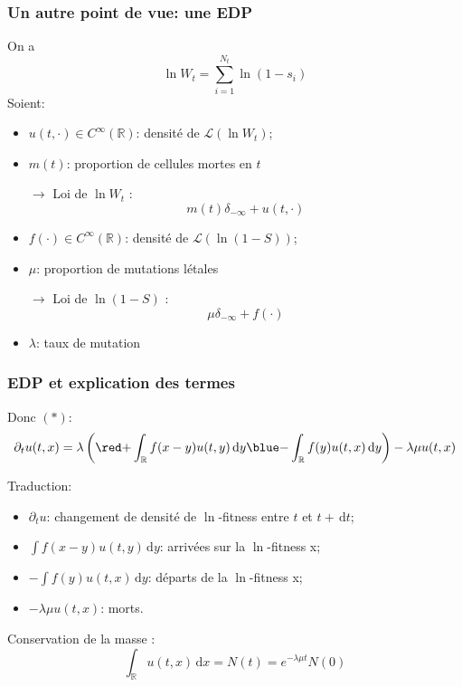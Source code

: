\documentclass{beamer}
\newcommand{\pth}[1]{\left(#1\right)}
\newcommand{\de}{\,\text{d}}
\newcommand{\Er}{\mathbb{R}}
\newcommand{\dr}{\partial}
\begin{document}
\begin{frame}
  \frametitle{Un autre point de vue: une EDP}

  On a \[\ln W_t=\sum_{i=1}^{N_t}\ln(1-s_i)\]
  Soient:
\begin{itemize}[label=$\bullet$]
\item $u(t,\cdot)\in C^{\infty}(\Er)$: densité de $\mathcal{L}(\ln W_t)$;
\item $m(t)$: proportion de cellules mortes en $t$

$\to$ Loi de $\ln W_t$ :
\[\label{def_u} m(t)\delta_{-\infty}+u(t,\cdot)\]
\pause
\item $f(\cdot)\in C^{\infty}(\Er)$: densité de $\mathcal{L}(\ln(1-S))$;
\item $\mu$: proportion de mutations létales

$\to$ Loi de $\ln (1-S)$ :
\[\mu\delta_{-\infty}+f(\cdot)\]
\item $\lambda$: taux de mutation
\end{itemize}

\end{frame}
\begin{frame}
  \frametitle{EDP et explication des termes}

Donc $(*)$:
\[\dr_tu(t,x)=\lambda\pth{{\red +}\int_{\Er}f(x-y)u(t,y)\de y{\blue -}\int_{\Er}f(y)u(t,x)\de y}-\lambda\mu u(t,x)\]

\vspace{0.5cm}

Traduction:%
\begin{itemize}[label=$\bullet$]
\item $\dr_tu$: changement de densité de $\ln$-fitness entre $t$ et $t+\de t$;
\item $\int f(x-y)u(t,y)\de y$: arrivées sur la $\ln$-fitness x;
\item $-\int f(y)u(t,x)\de y$: départs de la $\ln$-fitness x;
\item $-\lambda\mu u(t,x)$: morts.
\end{itemize} 

\vspace{0.5cm}%

Conservation de la masse : $$\int_{\Er} u(t,x)\de x=N(t)=e^{-\lambda\mu t}N(0)$$

\end{frame}
\end{document}
